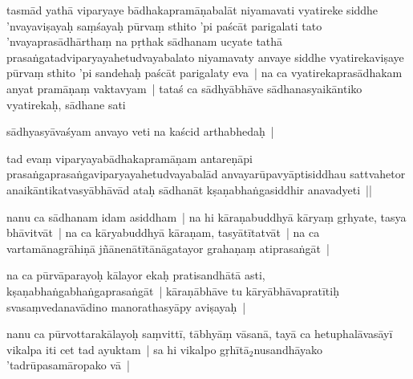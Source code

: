 \documentclass[article,12pt,a4paper]{memoir}%
\newcounter{parCount}
\begin{document}
	  
	  \pstart \leavevmode%
	\label{thakur75-70.20}tasmād yathā viparyaye bādhakapramāṇabalāt niyamavati vyatireke siddhe 'nvayaviṣayaḥ saṃśayaḥ pūrvaṃ sthito 'pi paścāt parigalati tato 'nvayaprasādhārthaṃ na pṛthak sādhanam ucyate tathā prasaṅgatadviparyayahetudvayabalato niyamavaty anvaye siddhe vyatirekaviṣaye pūrvaṃ sthito 'pi sandehaḥ paścāt parigalaty eva | na ca vyatirekaprasādhakam anyat pramāṇaṃ vaktavyam | tataś ca sādhyābhāve sādhanasyaikāntiko vyatirekaḥ, sādhane sati
	{}
	\pend%
      

	  
	  \pstart \leavevmode%
	sādhyasyāvaśyam anvayo veti na kaścid arthabhedaḥ |
	{}
	\pend%
      

	  
	  \pstart \leavevmode%
	\label{thakur75-70.26}tad evaṃ viparyayabādhakapramāṇam antareṇāpi prasaṅgaprasaṅgaviparyayahetudvayabalād anvayarūpavyāptisiddhau sattvahetor anaikāntikatvasyābhāvād ataḥ sādhanāt kṣaṇabhaṅgasiddhir anavadyeti ||
	{}
	\pend%
      

	  
	  \pstart \leavevmode%
	\label{thakur75-71.1}nanu ca sādhanam idam asiddham | na hi kāraṇabuddhyā kāryaṃ gṛhyate, tasya bhāvitvāt | na ca kāryabuddhyā \leavevmode{} kāraṇam, tasyātītatvāt | na ca vartamānagrāhiṇā jñānenātītānāgatayor grahaṇaṃ atiprasaṅgāt |
	{}
	\pend%
      

	  
	  \pstart \leavevmode%
	\label{thakur75-71.3}na ca pūrvāparayoḥ kālayor ekaḥ pratisandhātā asti, kṣaṇabhaṅgabhaṅgaprasaṅgāt | kāraṇābhāve tu kāryābhāvapratītiḥ svasaṃvedanavādino manorathasyāpy aviṣayaḥ |
	{}
	\pend%
      

	  
	  \pstart \leavevmode%
	\label{thakur75-71.5}nanu ca pūrvottarakālayoḥ saṃvittī, tābhyāṃ vāsanā, tayā ca \label{ratnakīrtinibandhāvali__36r1PF7IMUVC4DF8QV4LEE5R9OG}hetu\label{ratnakīrtinibandhāvali__36r1PF7IMUU5ZOUZZQDXUR7YR87}phalāvasāyī vikalpa iti cet tad ayuktam | sa hi vikalpo gṛhītā{\tiny $_{2}$}nusandhāyako 'tadrūpasamāropako vā |
	{}
	\pend%
      
\end{document}
